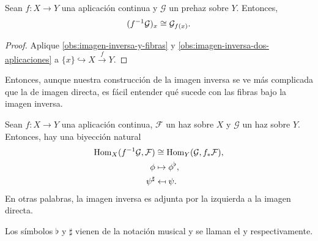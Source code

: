 \documentclass{article}
\numberwithin{equation}{section}
\theoremstyle{definition}
\begin{document}
\begin{corolario}
  \label{corolario:fibras-e-imagen-inversa}
  Sean $f\colon X\to Y$ una aplicación continua y $\mathcal{G}$ un prehaz sobre
  $Y$. Entonces,
  $$(f^{-1} \mathcal{G})_x \cong \mathcal{G}_{f (x)}.$$

  \begin{proof}
    Aplique \ref{obs:imagen-inversa-y-fibras}
    y \ref{obs:imagen-inversa-dos-aplicaciones}
    a $\{ x \} \hookrightarrow X \xrightarrow{f} Y$.
  \end{proof}
\end{corolario}

Entonces, aunque nuestra construcción de la imagen inversa se ve más complicada
que la de imagen directa, es fácil entender qué sucede con las fibras bajo
la imagen inversa.

\begin{teorema}
  \label{thm:adjuncion-musical}
  Sean $f\colon X\to Y$ una aplicación continua, $\mathcal{F}$ un haz sobre $X$
  y $\mathcal{G}$ un haz sobre $Y$. Entonces, hay una biyección natural
  \begin{align*}
    \operatorname{Hom}_X (f^{-1} \mathcal{G}, \mathcal{F}) & \cong \operatorname{Hom}_Y (\mathcal{G}, f_* \mathcal{F}),\\
    \phi & \mapsto \phi^\flat,\\
    \psi^\sharp & \mapsfrom \psi.
  \end{align*}
  En otras palabras, la imagen inversa es adjunta por la izquierda a la imagen
  directa.
\end{teorema}

Los símbolos $\flat$ y $\sharp$ vienen de la notación musical y se llaman
el  y  respectivamente.
\end{document}
